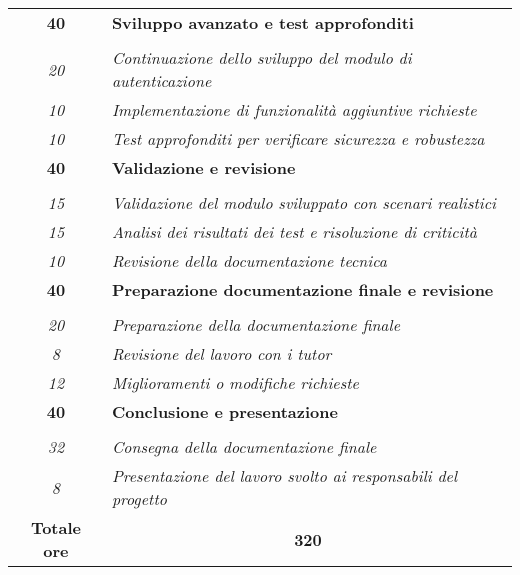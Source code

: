\begin{tabularx}{\textwidth}{|c|X|}
    \textbf{40} & \textbf{Sviluppo avanzato e test approfonditi} \\ \hdashline 
    \multirow{3}{0cm}\\ 
    \textit{20} & 
    \textit{Continuazione dello sviluppo del modulo di autenticazione} \\
    \textit{10} & 
    \textit{Implementazione di funzionalità aggiuntive richieste} \\
    \textit{10} & 
    \textit{Test approfonditi per verificare sicurezza e robustezza} \\
    \hline
    
    \textbf{40} & \textbf{Validazione e revisione} \\ \hdashline 
    \multirow{3}{0cm}\\ 
    \textit{15} & 
    \textit{Validazione del modulo sviluppato con scenari realistici} \\
    \textit{15} & 
    \textit{Analisi dei risultati dei test e risoluzione di criticità} \\
    \textit{10} & 
    \textit{Revisione della documentazione tecnica} \\
    \hline
    
    \textbf{40} & \textbf{Preparazione documentazione finale e revisione} \\ \hdashline 
    \multirow{3}{0cm}\\ 
    \textit{20} & 
    \textit{Preparazione della documentazione finale} \\
    \textit{8} & 
    \textit{Revisione del lavoro con i tutor} \\
    \textit{12} & 
    \textit{Miglioramenti o modifiche richieste} \\
    \hline
    
    \textbf{40} & \textbf{Conclusione e presentazione} \\ \hdashline 
    \multirow{2}{0cm}\\ 
    \textit{32} & 
    \textit{Consegna della documentazione finale} \\
    \textit{8} & 
    \textit{Presentazione del lavoro svolto ai responsabili del progetto} \\
    \hline
    
    \textbf{Totale ore} & \multicolumn{1}{|c|}{\textbf{320}} \\\hline
    
    
\end{tabularx}